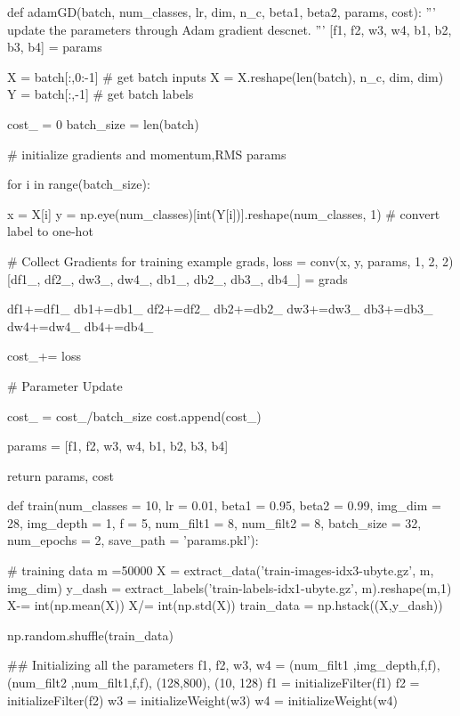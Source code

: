   

\stopsection

\starttyping
def adamGD(batch, num_classes, lr, dim, n_c, beta1, beta2, params, cost):
    '''
    update the parameters through Adam gradient descnet.
    '''
    [f1, f2, w3, w4, b1, b2, b3, b4] = params
    
    X = batch[:,0:-1] # get batch inputs
    X = X.reshape(len(batch), n_c, dim, dim)
    Y = batch[:,-1] # get batch labels
    
    cost_ = 0
    batch_size = len(batch)
    
    # initialize gradients and momentum,RMS params

    for i in range(batch_size):
        
        x = X[i]
        y = np.eye(num_classes)[int(Y[i])].reshape(num_classes, 1) # convert label to one-hot
        
        # Collect Gradients for training example
        grads, loss = conv(x, y, params, 1, 2, 2)
        [df1_, df2_, dw3_, dw4_, db1_, db2_, db3_, db4_] = grads
        
        df1+=df1_
        db1+=db1_
        df2+=df2_
        db2+=db2_
        dw3+=dw3_
        db3+=db3_
        dw4+=dw4_
        db4+=db4_

        cost_+= loss

    # Parameter Update  

    

    cost_ = cost_/batch_size
    cost.append(cost_)

    params = [f1, f2, w3, w4, b1, b2, b3, b4]
    
    return params, cost


\stoptyping

\starttyping
def train(num_classes = 10, lr = 0.01, beta1 = 0.95, beta2 = 0.99, img_dim = 28, img_depth = 1, f = 5, num_filt1 = 8, num_filt2 = 8, batch_size = 32, num_epochs = 2, save_path = 'params.pkl'):

    # training data
    m =50000
    X = extract_data('train-images-idx3-ubyte.gz', m, img_dim)
    y_dash = extract_labels('train-labels-idx1-ubyte.gz', m).reshape(m,1)
    X-= int(np.mean(X))
    X/= int(np.std(X))
    train_data = np.hstack((X,y_dash))
    
    np.random.shuffle(train_data)

    ## Initializing all the parameters
    f1, f2, w3, w4 = (num_filt1 ,img_depth,f,f), (num_filt2 ,num_filt1,f,f), (128,800), (10, 128)
    f1 = initializeFilter(f1)
    f2 = initializeFilter(f2)
    w3 = initializeWeight(w3)
    w4 = initializeWeight(w4)

